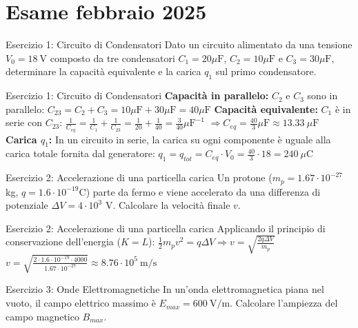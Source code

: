 \documentclass[a4paper]{article}
\begin{document}
\section{Esame febbraio 2025}
\begin{snippetexercise}{Esercizio 1: Circuito di Condensatori}
    Dato un circuito alimentato da una tensione \(V_{0}=18~\mathrm{V}\) composto da tre condensatori \(C_{1}=20\mu \mathrm{F}\), \(C_{2}=10\mu \mathrm{F}\) e \(C_{3}=30\mu \mathrm{F}\), determinare la capacità equivalente e la carica \(q_{1}\) sul primo condensatore.
\end{snippetexercise}
\begin{snippetsolution}{Esercizio 1: Circuito di Condensatori}
    \textbf{Capacità in parallelo:} \(C_{2}\) e \(C_{3}\) sono in parallelo:
    \(C_{23} = C_{2} + C_{3} = 10\mu \mathrm{F} + 30\mu \mathrm{F} = 40\mu \mathrm{F}\)
    \textbf{Capacità equivalente:} \(C_{1}\) è in serie con \(C_{23}\):
    \(\frac{1}{C_{eq}} = \frac{1}{C_{1}} + \frac{1}{C_{23}} = \frac{1}{20} + \frac{1}{40} = \frac{3}{40}\mu \mathrm{F}^{-1}\)
    \(\Rightarrow C_{eq} = \frac{40}{3}\mu \mathrm{F} \approx 13.33~\mu \mathrm{F}\)
    \textbf{Carica \(q_{1}\):} In un circuito in serie, la carica su ogni componente è uguale alla carica totale fornita dal generatore:
    \(q_{1} = q_{tot} = C_{eq} \cdot V_{0} = \frac{40}{3} \cdot 18 = 240~\mu \mathrm{C}\)
\end{snippetsolution}
\begin{snippetexercise}{Esercizio 2: Accelerazione di una particella carica}
    Un protone (\(m_{p}=1.67\cdot10^{-27}\) kg, \(q=1.6\cdot10^{-19}\mathrm{C}\)) parte da fermo e viene accelerato da una differenza di potenziale \(\Delta V=4\cdot10^{3}\) V. Calcolare la velocità finale \(v\).
\end{snippetexercise}
\begin{snippetsolution}{Esercizio 2: Accelerazione di una particella carica}
    Applicando il principio di conservazione dell'energia (\(K=L\)):
    \(\frac{1}{2}m_{p}v^{2} = q\Delta V \Rightarrow v = \sqrt{\frac{2q\Delta V}{m_{p}}}\)
    \(v = \sqrt{\frac{2\cdot1.6\cdot10^{-19}\cdot4000}{1.67\cdot10^{-27}}} \approx 8.76\cdot10^{5}~\mathrm{m/s}\)
\end{snippetsolution}
\begin{snippetexercise}{Esercizio 3: Onde Elettromagnetiche}
    In un'onda elettromagnetica piana nel vuoto, il campo elettrico massimo è \(E_{max}=600~\mathrm{V/m}\). Calcolare l'ampiezza del campo magnetico \(B_{max}\).
\end{snippetexercise}
\end{document}
